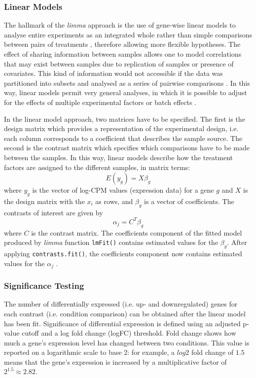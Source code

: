         \subsubsection{Linear Models}
        
        The hallmark of the \textit{limma} approach is the use of gene-wise linear models to analyse entire experiments as an integrated whole rather than simple comparisons between pairs of treatments  \cite{Ritchie2015LimmaStudies}, therefore allowing more flexible hypotheses. The effect of sharing information between samples allows one to model correlations that may exist between samples due to replication of samples or presence of covariates. This kind of information would not accessible if the data was partitioned into subsets and analysed as a series of pairwise comparisons \cite{Love2016RNA-SeqApproved}. In this way, linear models permit very general analyses, in which it is possible to adjust for the effects of multiple experimental factors or batch effects  \cite{Ritchie2015LimmaStudies}.
        
        In the linear model approach,  two matrices have to be specified. The first is the design matrix which provides a representation of the experimental design, i.e. each column corresponds to a coefficient that describes the sample source. The second is the contrast matrix which specifies which comparisons have to be made between the samples. In this way, linear models describe how the treatment factors are assigned to the different samples, in matrix terms: $$ E(y_g) = X \beta_g$$ where $y_g$ is the vector of log-CPM values (expression data) for a gene $g$ and $X$ is the design matrix with the $x_i $ as rows, and $ \beta_g$ is a vector of coefficients. The contrasts of interest are given by $$\alpha_j = C^T \beta_g$$ where $C$ is the contrast matrix. The coefficients component of the fitted model produced by \textit{limma} function \texttt{lmFit()} contains estimated values for the $\beta_g$. After applying \texttt{contrasts.fit()}, the coefficients component now contains estimated values for the $\alpha_j$ \cite{Smyth2005}.
        
        \subsubsection{Significance Testing}
        
        The number of differentially expressed (i.e. up- and downregulated) genes for each contrast (i.e. condition comparison) can be obtained after the linear model has been fit. Significance of differential expression is defined using an adjusted p-value cutoff and a log fold change (logFC) threshold.
        Fold change shows how much a gene’s expression level has changed between two conditions. This value is reported on a logarithmic scale to base 2: for example, a $log2$ fold change of $1.5$ means that the gene’s expression is increased by a multiplicative factor of $2^{1.5} \approx 2.82$.
        
